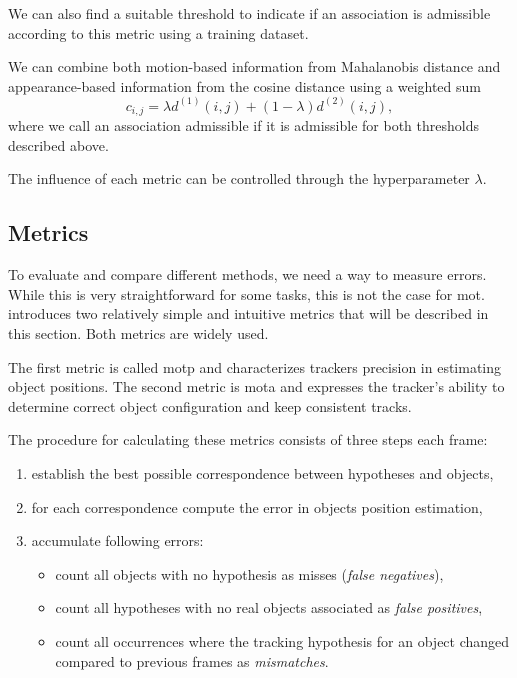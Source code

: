 We can also find a suitable threshold to indicate if an association is admissible according to this metric using a training dataset.

We can combine both motion-based information from Mahalanobis distance and appearance-based information from the cosine distance using a weighted sum
$$
c_{i,j} = \lambda d^{(1)}(i,j) + (1-\lambda)d^{(2)}(i,j),
$$
where we call an association admissible if it is admissible for both thresholds described above.

The influence of each metric can be controlled through the hyperparameter $\lambda$.

\subsection{Metrics}

To evaluate and compare different methods, we need a way to measure errors. While this is very straightforward for some tasks, this is not the case for \gls{mot}. \cite{bernardin2008evaluating_Clear_mot_metrics} introduces two relatively simple and intuitive metrics that will be described in this section. Both metrics are widely used\cite{MOT16}.

The first metric is called \gls{motp} and characterizes trackers precision in estimating object positions. The second metric is \gls{mota} and expresses the tracker's ability to determine correct object configuration and keep consistent tracks.

The procedure for calculating these metrics consists of three steps each frame:
\begin{enumerate}
    \item establish the best possible correspondence between hypotheses and objects,
    \item for each correspondence compute the error in objects position estimation,
    \item accumulate following errors:
    \begin{itemize}
        \item count all objects with no hypothesis as misses (\textit{false negatives}),
        \item count all hypotheses with no real objects associated as \textit{false positives},
        \item count all occurrences where the tracking hypothesis for an object changed compared to previous frames as \textit{mismatches}.
    \end{itemize}
\end{enumerate}


